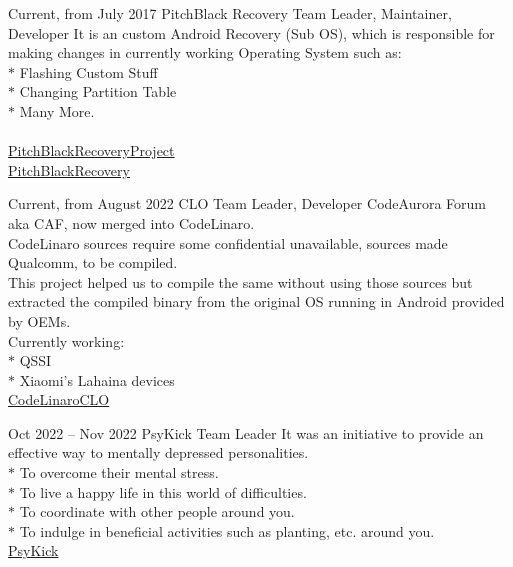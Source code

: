 \documentclass[
	10pt, %
]{FreemanCV}
\begin{document}
\begin{paracol}{2}


\jobentry
	{Current, from July 2017} %
	{} %
	{PitchBlack Recovery} %
	{Team Leader, Maintainer, Developer} %
	{It is an custom Android Recovery (Sub OS), which is responsible for making changes in currently working Operating System such as:\\
	 $*$ Flashing Custom Stuff\\
	 $*$ Changing Partition Table\\
	 $*$ Many More.\\
	 \\
	\raisebox{-1pt}{\faGithubSquare} \href{https://github.com/PitchBlackRecoveryProject}{PitchBlackRecoveryProject}\\
	\raisebox{-1pt}{\faGlobe} \href{https://pitchblackrecovery.com}{PitchBlackRecovery}} %


\jobentry
	{Current, from August 2022} %
	{} %
	{CLO} %
	{Team Leader, Developer} %
	{CodeAurora Forum aka CAF, now merged into CodeLinaro. \\
	CodeLinaro sources require some confidential unavailable, sources made Qualcomm, to be compiled. \\
	This project helped us to compile the same without using those sources but extracted the compiled binary from the original OS running in Android provided by OEMs. \\
	Currently working:\\
	 $*$ QSSI\\
	 $*$ Xiaomi's Lahaina devices\\
	\raisebox{-1pt}{\faGithubSquare} \href{https://github.com/CodeLinaroCLO}{CodeLinaroCLO}} %



\jobentry
	{Oct 2022 -- Nov 2022} %
	{} %
	{PsyKick} %
	{Team Leader} %
	{It was an initiative to provide an effective way to mentally depressed personalities.\\
	 $*$ To overcome their mental stress.\\
	 $*$ To live a happy life in this world of difficulties.\\
	 $*$ To coordinate with other people around you.\\
	 $*$ To indulge in beneficial activities such as planting, etc. around you.\\
	 \raisebox{-1pt}{\faGithubSquare} \href{https://github.com/PsyKick-MIT}{PsyKick}} %


\end{paracol}
\end{document}
